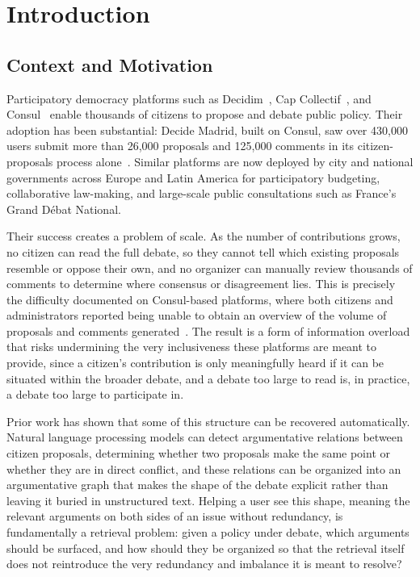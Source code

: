 \chapter{Introduction}

\section{Context and Motivation}\label{sec:context}
Participatory democracy platforms such as Decidim~\cite{barandiaran2024decidim}, Cap
Collectif~\cite{shin2024digitaltools}, and Consul~\cite{aranacatania2021consul} enable thousands
of citizens to propose and debate public policy. Their adoption has been substantial: Decide
Madrid, built on Consul, saw over 430{,}000 users submit more than 26{,}000 proposals and
125{,}000 comments in its citizen-proposals process alone~\cite{aranacatania2021consul}. Similar
platforms are now deployed by city and national governments across Europe and Latin America for
participatory budgeting, collaborative law-making, and large-scale public consultations such as
France's Grand D\'ebat National.

Their success creates a problem of scale. As the number of contributions grows, no citizen can
read the full debate, so they cannot tell which existing proposals resemble or oppose their own,
and no organizer can manually review thousands of comments to determine where consensus or
disagreement lies. This is precisely the difficulty documented on Consul-based platforms, where
both citizens and administrators reported being unable to obtain an overview of the volume of
proposals and comments generated~\cite{aranacatania2021consul}. The result is a form of
information overload that risks undermining the very inclusiveness these platforms are meant to
provide, since a citizen's contribution is only meaningfully heard if it can be situated within
the broader debate, and a debate too large to read is, in practice, a debate too large to
participate in.

Prior work has shown that some of this structure can be recovered automatically. Natural language
processing models can detect argumentative relations between citizen proposals, determining
whether two proposals make the same point or whether they are in direct conflict, and these
relations can be organized into an argumentative graph that makes the shape of the debate explicit
rather than leaving it buried in unstructured text. Helping a user see this shape, meaning the
relevant arguments on both sides of an issue without redundancy, is fundamentally a retrieval
problem: given a policy under debate, which arguments should be surfaced, and how should they be
organized so that the retrieval itself does not reintroduce the very redundancy and imbalance it
is meant to resolve?

